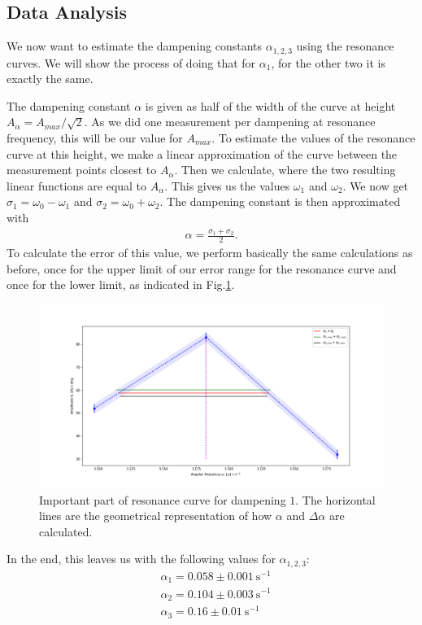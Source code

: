\subsection{Data Analysis}

We now want to estimate the dampening constants $\alpha_{1, 2, 3}$ using the resonance curves.
We will show the process of doing that for $\alpha_1$, for the other two it is exactly the same.

The dampening constant $\alpha$ is given as half of the width of the curve at height $A_{\alpha} = A_{max}/\sqrt{2}$.
As we did one measurement per dampening at resonance frequency, this will be our value for $A_{max}$.
To estimate the values of the resonance curve at this height, we make a linear approximation of the curve between the measurement points closest to $A_{\alpha}$.
Then we calculate, where the two resulting linear functions are equal to $A_{\alpha}$.
This gives us the values $\omega_1$ and $\omega_2$.
We now get $\sigma_1 = \omega_0 - \omega_1$ and $\sigma_2 = \omega_0 + \omega_2$.
The dampening constant is then approximated with 
\begin{align*}
	\alpha = \frac{\sigma_1 + \sigma_2}{2}.
\end{align*}
To calculate the error of this value, we perform basically the same calculations as before, once for the upper limit of our error range for the resonance curve and once for the lower limit, as indicated in Fig.\ref{fig::res_calc}.
\begin{figure} [ht]
	\centering
	\includegraphics[width=500pt]{python/res_calc.PNG}
	\caption{Important part of resonance curve for dampening $1$. The horizontal lines are the geometrical representation of how $\alpha$ and $\Delta \alpha$ are calculated.}
	\label{fig::res_calc}
\end{figure}

In the end, this leaves us with the following values for $\alpha_{1, 2, 3}$:
\begin{align*}
	&\alpha_1 = 0.058 \pm \SI{0.001}{\second^{-1}}\\
	&\alpha_2 = 0.104 \pm \SI{0.003}{\second^{-1}}\\
	&\alpha_3 = 0.16 \pm \SI{0.01}{\second^{-1}}
\end{align*}
